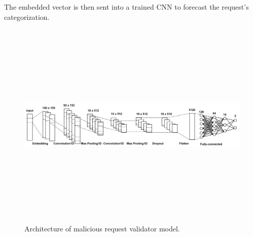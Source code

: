 The embedded vector is then sent into a trained CNN to forecast the request's categorization. 

\begin{figure}[!h]
	\centering
	\includegraphics[width=\linewidth, height=10cm,keepaspectratio]{figures/layers.png}
  \caption{Architecture of malicious request validator model.}
\end{figure} 

